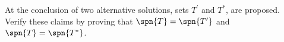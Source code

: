 At the conclusion of  two alternative solutions, sets $T^{\prime}$ and $T^{*}$, are proposed.  Verify these claims by proving that $\spn{T}=\spn{T^{\prime}}$ and $\spn{T}=\spn{T^{*}}$.